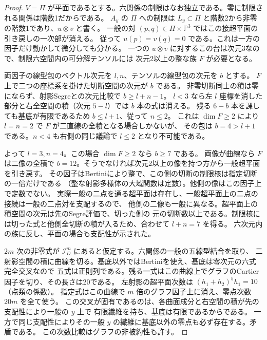 \begin{proof}
$V=\Pi$ が平面であるとする。六関係の制限はなお独立である。零に制限される関係は階数1だからである。
$A_y$ の $\Pi$ への制限は $L_y\subset\Pi$ と階数2から非零の階数1であり、$u\otimes v$ と書く。
一般の対 $(p,q)\in\Pi\times\mathbb P^3$ ではこの接超平面の引き戻しの一次部が消える。
従って $u(p)=v(q)=0$ である。これは一方の因子だけ動かして微分しても分かる。
一つの $u\otimes v$ に対するこの台は次元3なので、制限六空間内の可分解テンソルには
次元2以上の整な族 $F$ が必要となる。

両因子の線型包のベクトル次元を $l,n$、テンソルの線型包の次元を $b$ とする。
$F$ 上で二つの座標系を掛けた切断空間の次元が $b$ である。
非零切断同士の積は零にならず、射影Segreとの次元比較で $b\ge l+n-1$。
$l<3$ なら左 $l$ 座標を消した部分と右全空間の積（次元 $5-l$）では $b$ 本の式は消える。
残る $6-b$ 本を課しても基底が有限であるため $b\le l+1$、従って $n\le2$。
これは $\dim F\ge2$ により $l=n=2$ で $F$ が二直線の全積となる場合しかないが、
その包は $b=4>l+1$ である。$n<4$ も右側の同じ議論で $l\le2$ となり不可能である。

よって $l=3,n=4$。この場合 $\dim F\ge2$ なら $b\ge7$ である。
両像が曲線なら $F$ は二像の全積で $b=12$。そうでなければ次元2以上の像を持つ方から一般超平面を引き戻す。
その因子はBertiniにより整で、この側の切断の制限核は指定切断の一倍だけである
（整な射影多様体の大域関数は定数）。他側の像はこの因子上で定数でない。
実際一般の二点を通る超平面は存在し、一般超平面上の二点の接続は一般の二点対を支配するので、
他側の二像も一般に異なる。超平面上の積空間の次元は先のSegre評価で、切った側の
元の切断数以上である。制限核には切った式と他側全切断の積が入るため、合わせて $l+n=7$ を得る。
六次元内の族に反し、平面の場合も支配性が示された。

$2m$ 次の非零式が $\mathcal I_D^m$ にあると仮定する。六関係の一般の五線型結合を取り、
二射影空間の積に曲線を切る。基底以外ではBertiniを使え、基底は零次元の六式完全交叉なので
五式は正則列である。残る一式はこの曲線上でグラフのCartier因子を切り、その長さは20である。
左射影の超平面次数は $(h_1+h_2)^5 h_1=10$（点類の係数）。
指定式はこの曲線で $m$ 倍のグラフ因子上に消え、零点次数 $20m$ を全て使う。
この交叉が固有であるのは、各曲面成分と右空間の積が先の支配性により一般の $y$ 上で
有限繊維を持ち、基底は有限であるからである。
一方で同じ支配性によりその一般 $y$ の繊維に基底以外の零点も必ず存在する。矛盾である。
この次数比較はグラフの非被約性も許す。
\end{proof}

